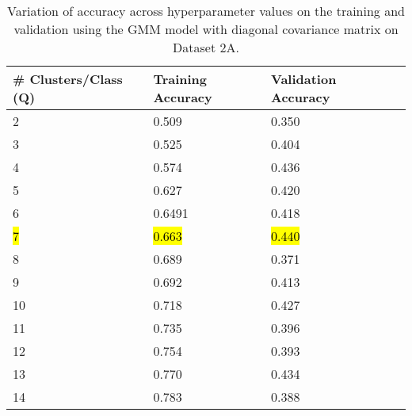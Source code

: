 \begin{table}[H]
\centering
\begin{tabular}{l l l l}
\hline
\hline
\textbf{# Clusters/Class (Q)} & \textbf{Training Accuracy} & \textbf{Validation Accuracy}\\
\hline
\hline
2 & 0.509 & 0.350\\
3 & 0.525 & 0.404\\
4 & 0.574 & 0.436\\
5 & 0.627 & 0.420\\
6 & 0.6491 & 0.418\\
\hl{7} & \hl{0.663} & \hl{0.440}\\
8 & 0.689 & 0.371\\
9 & 0.692 & 0.413\\
10 & 0.718 & 0.427\\
11 & 0.735 & 0.396\\
12 & 0.754 & 0.393\\
13 & 0.770 & 0.434\\
14 & 0.783 & 0.388\\
\hline
\end{tabular}
\caption{Variation of accuracy across hyperparameter values on the training and validation using the GMM model with diagonal covariance matrix on Dataset 2A. }
\label{tab:acc2a}
\end{table}

